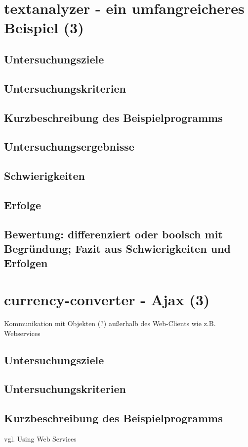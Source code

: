 \documentclass[a4paper, 12pt, hidelinks, listof=totoc, listoftables=totoc, bibliography=totoc]{scrreprt}
\begin{document}
\section{textanalyzer - ein umfangreicheres Beispiel (3)}

\subsection{Untersuchungsziele}
\subsection{Untersuchungskriterien}
\subsection{Kurzbeschreibung des Beispielprogramms}
\subsection{Untersuchungsergebnisse}
\subsection{Schwierigkeiten}
\subsection{Erfolge}
\subsection{Bewertung: differenziert oder boolsch mit Begründung; Fazit aus Schwierigkeiten und Erfolgen}

\section{currency-converter - Ajax (3)}
Kommunikation mit Objekten (?) außerhalb des Web-Clients wie z.B. Webservices
\subsection{Untersuchungsziele}
\subsection{Untersuchungskriterien}
\subsection{Kurzbeschreibung des Beispielprogramms}
vgl. Using Web Services \cite[\#UsingWebServices]{haoyi.HOS}
\end{document}
